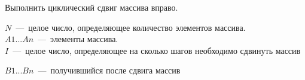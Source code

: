 Выполнить циклический сдвиг массива вправо.

\InputFile
\noindent
$N$~---~целое число, определяющее количество элементов массива.
\\
$A1...An$~---~элементы массива. 
\\
$I$~---~целое число, определяющее на сколько шагов необходимо сдвинуть массив

\OutputFile
\noindent
$B1...Bn$~---~получившийся после сдвига массив

\SAMPLES

